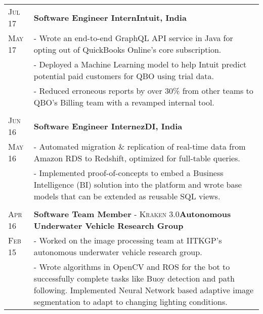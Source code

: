 \documentclass[a4paper,10pt]{extarticle} %
\begin{document}
\begin{tabularx}{\linewidth}{ l | X }

\textsc{Jul 17} & \textbf{Software Engineer Intern}\hfill\textbf{Intuit, India}\\
\textsc{May 17}& {- Wrote an end-to-end GraphQL API service in Java for opting out of QuickBooks Online's core subscription.}\\
& {- Deployed a Machine Learning model to help Intuit predict potential paid customers for QBO using trial data.}\\
& {- Reduced erroneous reports by over 30\% from other teams to QBO's Billing team with a revamped internal tool.}\\
\multicolumn{2}{c}{} \\

\textsc{Jun 16} & \textbf{Software Engineer Intern}\hfill\textbf{ezDI, India}\\
\textsc{May 16}& {- Automated migration \& replication of real-time data from Amazon RDS to Redshift, optimized for full-table queries.}\\
& {- Implemented proof-of-concepts to embed a Business Intelligence (BI) solution into the platform and wrote base models that can be extended as reusable SQL views.}\\
\multicolumn{2}{c}{} \\

\textsc{Apr 16} & \textbf{Software Team Member} \textsc{- Kraken 3.0}\hfill\textbf{Autonomous Underwater Vehicle Research Group}\\
\textsc{Feb 15} & {- Worked on the image processing team at IITKGP's autonomous underwater vehicle research group.}\\
& {- Wrote algorithms in OpenCV and ROS for the bot to successfully complete tasks like Buoy detection and path following. Implemented Neural Network based adaptive image segmentation to adapt to changing lighting conditions.}
\end{tabularx}


\end{document}
